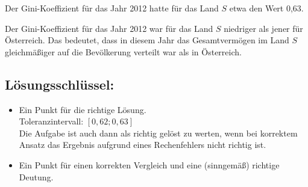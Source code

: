 \begin{langesbeispiel}
{\begin{enumerate}
Der Gini-Koeffizient für das Jahr 2012 hatte für das Land $S$ etwa den Wert 0,63.

Der Gini-Koeffizient für das Jahr 2012 war für das Land $S$ niedriger als jener für Österreich. Das bedeutet, dass in diesem Jahr das Gesamtvermögen im Land $S$ gleichmäßiger auf die Bevölkerung verteilt war als in Österreich.

\subsection{Lösungsschlüssel:}
\begin{itemize}
\item Ein Punkt für die richtige Lösung.\\
Toleranzintervall: $[0,62; 0,63]$\\
Die Aufgabe ist auch dann als richtig gelöst zu werten, wenn bei korrektem Ansatz das Ergebnis aufgrund eines Rechenfehlers nicht richtig ist.
\item Ein Punkt für einen korrekten Vergleich und eine (sinngemäß) richtige Deutung.
\end{itemize}

\end{enumerate}}
\end{langesbeispiel}